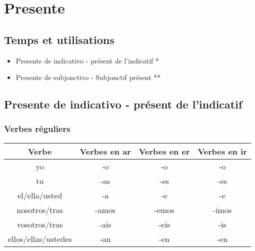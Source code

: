 \chapter{Presente}
\section{Temps et utilisations}
\begin{itemize}
    \item Presente de indicativo - présent de l'indicatif *
    \item Presente de subjonctivo - Subjonctif présent **
\end{itemize}
\newpage
\section{Presente de indicativo - présent de l'indicatif}
\subsection{Verbes réguliers}
\begin{table}[hbt!]
    \centering
    \setlength\tabcolsep{20pt}
    \begin{tabular}{|c||c|c|c|}
         \hline
         Verbe              & Verbes en \textbf{ar} & Verbes en \textbf{er} & Verbes en \textbf{ir} \\
         \hline
         \hline
         yo                 & -o                & -o            & -o \\    
         \hline
         tu                 & -as               & -es           & -es \\
         \hline
         el/ella/usted      &-a                 & -e            & -e \\
        \hline
        nosotros/tras       & -amos             & -emos         & -imos \\
        \hline
        vosotros/tras       & -ais              & -eis          & -is \\
        \hline
        ellos/ellas/ustedes & -an               & -en           & -en \\
        \hline
    \end{tabular}
    \label{tab:label2}
\end{table}
